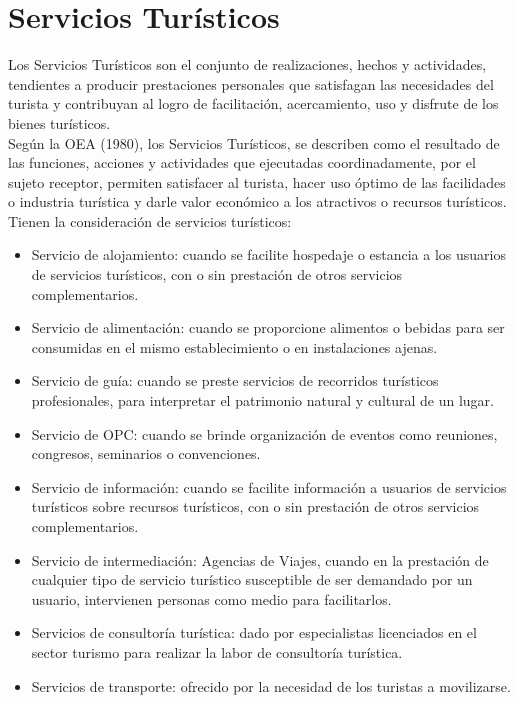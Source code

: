 \section{Servicios Turísticos}

Los Servicios Turísticos son el conjunto de  realizaciones, hechos y actividades, tendientes a producir prestaciones personales que satisfagan las necesidades del turista y contribuyan al logro de facilitación, acercamiento, uso y disfrute de los bienes turísticos. \\

Según la OEA (1980), los Servicios Turísticos, se describen como el resultado de las funciones, acciones y actividades que ejecutadas coordinadamente, por el sujeto receptor, permiten satisfacer al turista, hacer uso óptimo de las facilidades o industria turística y darle valor económico a los atractivos o recursos turísticos.\\

Tienen la consideración de servicios turísticos:

\begin{itemize}
	\item Servicio de alojamiento: cuando se facilite hospedaje o estancia a los usuarios de servicios turísticos, con o sin prestación de otros servicios complementarios.
	
	\item Servicio de alimentación: cuando se proporcione alimentos o bebidas para ser consumidas en el mismo establecimiento o en instalaciones ajenas.
	
	\item Servicio de guía: cuando se preste servicios de recorridos turísticos profesionales, para interpretar el patrimonio natural y cultural de un lugar.
	
	\item Servicio de OPC: cuando se brinde organización de eventos como reuniones, congresos, seminarios o convenciones.
	
	\item Servicio de información: cuando se facilite información a usuarios de servicios turísticos sobre recursos turísticos, con o sin prestación de otros servicios complementarios.
	
	\item Servicio de intermediación: Agencias de Viajes, cuando en la prestación de cualquier tipo de servicio turístico susceptible de ser demandado por un usuario, intervienen personas como medio para facilitarlos.
	
	\item Servicios de consultoría turística: dado por especialistas licenciados en el sector turismo para realizar la labor de consultoría turística.
	
	\item Servicios de transporte: ofrecido por la necesidad de los turistas a movilizarse.
	
\end{itemize}